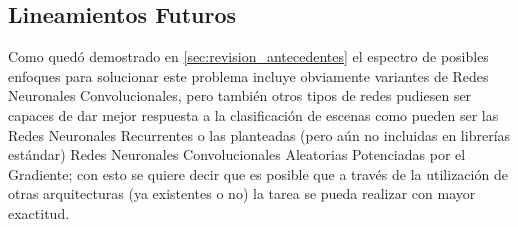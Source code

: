 \subsection{Lineamientos Futuros}

Como quedó demostrado en \ref{sec:revision_antecedentes} el espectro de posibles enfoques para solucionar este problema incluye obviamente variantes de Redes Neuronales Convolucionales, pero también otros tipos de redes pudiesen ser capaces de dar mejor respuesta a la clasificación de escenas como pueden ser las Redes Neuronales Recurrentes o las planteadas (pero aún no incluidas en librerías estándar) Redes Neuronales Convolucionales Aleatorias Potenciadas por el Gradiente; con esto se quiere decir que es posible que a través de la utilización de otras arquitecturas (ya existentes o no) la tarea se pueda realizar con mayor exactitud. 


